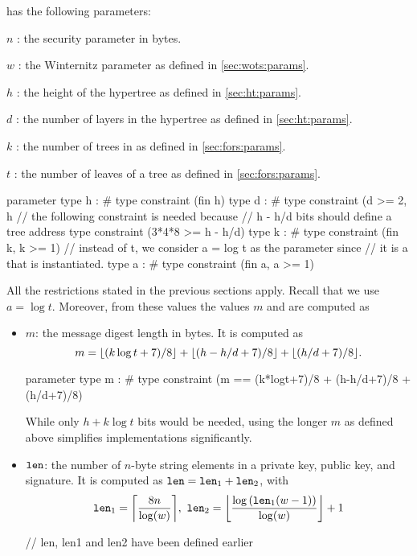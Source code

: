 \spx has the following parameters:
\begin{description}
 \item  $n$ : the security parameter in bytes.
 \item  $w$ : the Winternitz parameter as defined in \autoref{sec:wots:params}.
 \item  $h$ : the height of the hypertree as defined in \autoref{sec:ht:params}.
 \item  $d$ : the number of layers in the hypertree as defined in \autoref{sec:ht:params}.
 \item  $k$ : the number of trees in \fors as defined in \autoref{sec:fors:params}.
 \item  $t$ : the number of leaves of a \fors tree as defined in \autoref{sec:fors:params}.
\end{description}

\begin{code}
  parameter
    type h : #
    type constraint (fin h)
    type d : #
    type constraint (d >= 2, h%
    // the following constraint is needed because
    // h - h/d bits should define a tree address
    type constraint (3*4*8 >= h - h/d)
    type k : #
    type constraint (fin k, k >= 1)
    // instead of t, we consider a = log t as the parameter since
    // it is a that is instantiated.
    type a : #
    type constraint (fin a, a >= 1)
\end{code}

All the restrictions stated in the previous sections apply. Recall that
we use $a = \log t$. Moreover, from these values the values $m$ and \len are
computed as
\begin{itemize}
  \item $m$: the message digest length in bytes.
  It is computed as
  $$m=\lfloor(k\log t +7)/ 8\rfloor + \lfloor(h - h/d +7)/ 8\rfloor + \lfloor(h / d +7)/ 8\rfloor.$$

\begin{code}
  parameter
    type m : #
    type constraint (m == (k*logt+7)/8 + (h-h/d+7)/8 + (h/d+7)/8)
\end{code}

  While only $h + k\log t$ bits would be needed, using the longer $m$ as defined
  above simplifies implementations significantly.
  \item $\texttt{len}$: the number of $n$-byte string elements in a \wotsp private
        key, public key, and signature. It is computed as $\texttt{len} =
        \texttt{len}_1 + \texttt{len}_2$, with
        \begin{equation*}
          \len_1 = \ceil*{\frac{8n}{\log(w)}},\
          \len_2 = \floor*{\frac{\log{(\len_1(w - 1))}}{\log(w)}} + 1
        \end{equation*}

\begin{code}
  // len, len1 and len2 have been defined earlier
\end{code}
\end{itemize}

